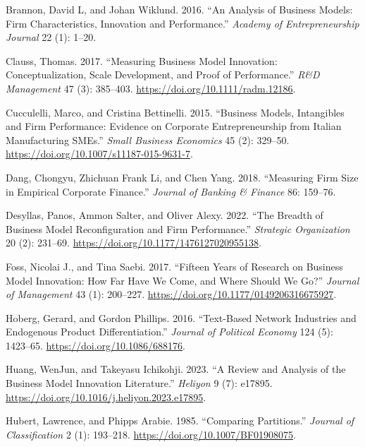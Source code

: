 \documentclass[
]{article}
\newlength{\cslhangindent}
\newenvironment{CSLReferences}[2] %
 {\begin{list}{}{%
  \setlength{\itemindent}{0pt}
  \setlength{\leftmargin}{0pt}
  \setlength{\parsep}{0pt}
  \ifodd #1
   \setlength{\leftmargin}{\cslhangindent}
   \setlength{\itemindent}{-1\cslhangindent}
  \fi
  \setlength{\itemsep}{#2\baselineskip}}}
 {\end{list}}
\begin{document}
\label{refs}
\begin{CSLReferences}{1}{0}
Brannon, David L, and Johan Wiklund. 2016. {``An Analysis of Business
Models: Firm Characteristics, Innovation and Performance.''}
\emph{Academy of Entrepreneurship Journal} 22 (1): 1--20.

Clauss, Thomas. 2017. {``Measuring Business Model Innovation:
Conceptualization, Scale Development, and Proof of Performance.''}
\emph{R\&D Management} 47 (3): 385--403.
\url{https://doi.org/10.1111/radm.12186}.

Cucculelli, Marco, and Cristina Bettinelli. 2015. {``Business Models,
Intangibles and Firm Performance: Evidence on Corporate Entrepreneurship
from {Italian} Manufacturing {SMEs}.''} \emph{Small Business Economics}
45 (2): 329--50. \url{https://doi.org/10.1007/s11187-015-9631-7}.

Dang, Chongyu, Zhichuan Frank Li, and Chen Yang. 2018. {``Measuring Firm
Size in Empirical Corporate Finance.''} \emph{Journal of Banking \&
Finance} 86: 159--76.

Desyllas, Panos, Ammon Salter, and Oliver Alexy. 2022. {``The Breadth of
Business Model Reconfiguration and Firm Performance.''} \emph{Strategic
Organization} 20 (2): 231--69.
\url{https://doi.org/10.1177/1476127020955138}.

Foss, Nicolai J., and Tina Saebi. 2017. {``Fifteen {Years} of {Research}
on {Business} {Model} {Innovation}: {How} {Far} {Have} {We} {Come}, and
{Where} {Should} {We} {Go}?''} \emph{Journal of Management} 43 (1):
200--227. \url{https://doi.org/10.1177/0149206316675927}.

Hoberg, Gerard, and Gordon Phillips. 2016. {``Text-{Based} {Network}
{Industries} and {Endogenous} {Product} {Differentiation}.''}
\emph{Journal of Political Economy} 124 (5): 1423--65.
\url{https://doi.org/10.1086/688176}.

Huang, WenJun, and Takeyasu Ichikohji. 2023. {``A Review and Analysis of
the Business Model Innovation Literature.''} \emph{Heliyon} 9 (7):
e17895. \url{https://doi.org/10.1016/j.heliyon.2023.e17895}.

Hubert, Lawrence, and Phipps Arabie. 1985. {``Comparing Partitions.''}
\emph{Journal of Classification} 2 (1): 193--218.
\url{https://doi.org/10.1007/BF01908075}.


\end{CSLReferences}
\end{document}
